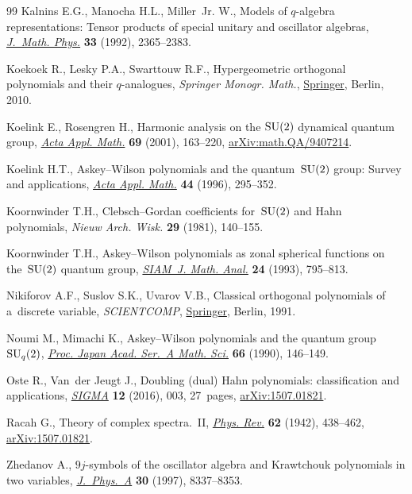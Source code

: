 \begin{thebibliography}{99}
Kalnins E.G., Manocha H.L., Miller~Jr. W., Models of {$q$}-algebra
 representations: {T}ensor products of special unitary and oscillator
 algebras, \href{https://doi.org/10.1063/1.529607}{\textit{J.~Math. Phys.}}
 \textbf{33} (1992), 2365--2383.

Koekoek R., Lesky P.A., Swarttouw R.F., Hypergeometric orthogonal polynomials
 and their {$q$}-analogues, \textit{Springer Monogr. Math.},
 \href{https://doi.org/10.1007/978-3-642-05014-5}{Springer}, Berlin, 2010.

Koelink E., Rosengren H., Harmonic analysis on the {${\rm SU}(2)$} dynamical
 quantum group, \href{https://doi.org/10.1023/A:1013071729320}{\textit{Acta
 Appl. Math.}} \textbf{69} (2001), 163--220,
 \href{http://arxiv.org/abs/math.QA/9407214}{arXiv:math.QA/9407214}.

Koelink H.T., Askey--{W}ilson polynomials and the quantum~{${\rm SU}(2)$}
 group: {S}urvey and applications,
 \href{https://doi.org/10.1007/BF00047396}{\textit{Acta Appl. Math.}}
 \textbf{44} (1996), 295--352.

Koornwinder T.H., Clebsch--{G}ordan coefficients for~{${\rm SU}(2)$} and {H}ahn
 polynomials, \textit{Nieuw Arch. Wisk.} \textbf{29} (1981), 140--155.

Koornwinder T.H., Askey--{W}ilson polynomials as zonal spherical functions on
 the~{${\rm SU}(2)$} quantum group,
 \href{https://doi.org/10.1137/0524049}{\textit{SIAM~J. Math. Anal.}}
 \textbf{24} (1993), 795--813.

Nikiforov A.F., Suslov S.K., Uvarov V.B., Classical orthogonal polynomials of a~discrete variable, \textit{SCIENTCOMP},
 \href{https://doi.org/10.1007/978-3-642-74748-9}{Springer}, Berlin, 1991.

Noumi M., Mimachi K., Askey--{W}ilson polynomials and the quantum group~{${\rm
 SU}_q(2)$}, \href{https://doi.org/10.3792/pjaa.66.146}{\textit{Proc. Japan
 Acad. Ser.~A Math. Sci.}} \textbf{66} (1990), 146--149.

Oste R., Van~der Jeugt J., Doubling (dual) {H}ahn polynomials: classification
 and applications,
 \href{https://doi.org/10.3842/SIGMA.2016.003}{\textit{SIGMA}} \textbf{12}
 (2016), 003, 27~pages,
 \href{http://arxiv.org/abs/1507.01821}{arXiv:1507.01821}.

Racah G., Theory of complex spectra.~{II},
 \href{https://doi.org/10.1103/PhysRev.62.438}{\textit{Phys. Rev.}}
 \textbf{62} (1942), 438--462,
 \href{http://arxiv.org/abs/1507.01821}{arXiv:1507.01821}.

Zhedanov A., {$9j$}-symbols of the oscillator algebra and {K}rawtchouk
 polynomials in two variables,
 \href{https://doi.org/10.1088/0305-4470/30/23/029}{\textit{J.~Phys.~A}}
 \textbf{30} (1997), 8337--8353.

\end{thebibliography}
